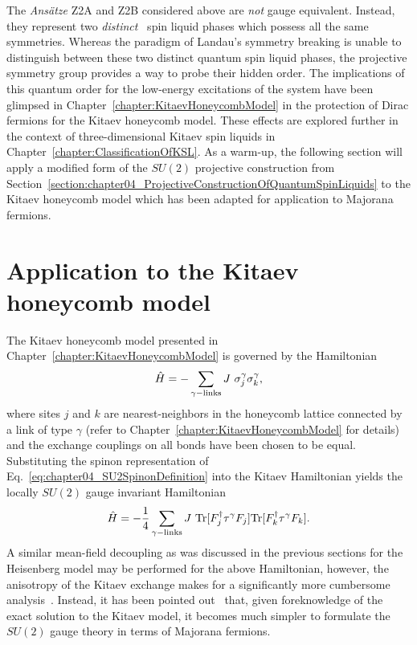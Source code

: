 The \textit{Ans\"atze} Z2A and Z2B considered above are \textit{not} gauge equivalent.
Instead, they represent two \textit{distinct} \ZZ~spin liquid phases which possess all the same symmetries.
Whereas the paradigm of Landau's symmetry breaking is unable to distinguish between these two distinct quantum spin liquid phases, the projective symmetry group provides a way to probe their hidden order.
The implications of this quantum order for the low-energy excitations of the system have been glimpsed in Chapter~\ref{chapter:KitaevHoneycombModel} in the protection of Dirac fermions for the Kitaev honeycomb model.
These effects are explored further in the context of three-dimensional Kitaev spin liquids in Chapter~\ref{chapter:ClassificationOfKSL}.
As a warm-up, the following section will apply a modified form of the $SU(2)$ projective construction from Section~\ref{section:chapter04_ProjectiveConstructionOfQuantumSpinLiquids} to the Kitaev honeycomb model which has been adapted for application to Majorana fermions.


%
\section{Application to the Kitaev honeycomb model}
\label{section:chapter04_ApplicationToTheKitaevHoneycombModel}
%
The Kitaev honeycomb model presented in Chapter~\ref{chapter:KitaevHoneycombModel} is governed by the Hamiltonian
%
\begin{equation}
	\hat{H} = -\sum_{\gamma{\rm -links}} J~\sigma^{\gamma}_j \sigma^{\gamma}_k, 
\end{equation}
%
where sites $j$ and $k$ are nearest-neighbors in the honeycomb lattice connected by a link of type $\gamma$ (refer to Chapter~\ref{chapter:KitaevHoneycombModel} for details) and the exchange couplings on all bonds have been chosen to be equal.
Substituting the spinon representation of Eq.~\eqref{eq:chapter04_SU2SpinonDefinition} into the Kitaev Hamiltonian yields the locally $SU(2)$ gauge invariant Hamiltonian
%
\begin{equation}
	\hat{H} = -\frac{1}{4} \sum_{\gamma {\rm -links}} J~\text{Tr}{[F\ensuremath{^{\dagger}}_j \tau^{\gamma} F_j]} \text{Tr}{[F\ensuremath{^{\dagger}}_k \tau^{\gamma} F_k]}.
\end{equation}
%
A similar mean-field decoupling as was discussed in the previous sections for the Heisenberg model may be performed for the above Hamiltonian, however, the anisotropy of the Kitaev exchange makes for a significantly more cumbersome analysis~\cite{BurnellPRB2011}.
Instead, it has been pointed out~\cite{BurnellPRB2011,YouPRB2012,SeifertPRBFeb2018} that, given foreknowledge of the exact solution to the Kitaev model, it becomes much simpler to formulate the $SU(2)$ gauge theory in terms of Majorana fermions.

